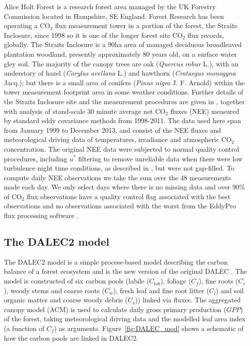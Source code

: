\documentclass[review]{elsarticle}
\begin{document}
Alice Holt Forest is a research forest area managed by the UK Forestry Commission located in Hampshire, SE England. Forest Research has been operating a $\text{CO}_{2}$ flux measurement tower in a portion of the forest, the Straits Inclosure, since 1998 so it is one of the longer forest site $\text{CO}_2$ flux records, globally. The Straits Inclosure is a $90 \text{ha}$ area of managed deciduous broadleaved plantation woodland, presently approximately $80$ years old, on a surface water gley soil. The majority of the canopy trees are oak (\textit{Quercus robur} L.), with an understory of hazel (\textit{Corylus avellana} L.) and hawthorn (\textit{Crataegus monogyna} Jacq.); but there is a small area of conifers (\textit{Pinus nigra} J. F. Arnold) within the tower measurement footprint area in some weather conditions. Further details of the Straits Inclosure site and the measurement procedures are given in \citet{wilkinson2012inter}, together with analysis of stand-scale $30$ minute average net $\text{CO}_{2}$ fluxes (NEE) measured by standard eddy covariance methods from 1998-2011. The data used here span from January 1999 to December 2013, and consist of the NEE fluxes and meteorological driving data of temperatures, irradiance and atmospheric $\text{CO}_2$ concentration. The original NEE data were subjected to normal quality control procedures, including $u^{*}$ filtering to remove unreliable data when there were low turbulence night time conditions, as described in \citet{wilkinson2012inter}, but were not gap-filled. To compute daily NEE observations we take the sum over the 48 measurements made each day. We only select days where there is no missing data and over $90\% $ of $\text{CO}_2$ flux observations have a quality control flag associated with the best observations and no observations associated with the worst from the EddyPro flux processing software \citep{eddypro}.

\subsection{The DALEC2 model}

The DALEC2 model is a simple process-based model describing the carbon balance of a forest ecosystem \citep{Bloom2015} and is the new version of the original DALEC \citep{williams2005improved}. The model is constructed of six carbon pools (labile ($C_{lab}$), foliage ($C_f$), fine roots ($C_r$), woody stems and coarse roots ($C_w$), fresh leaf and fine root litter ($C_l$) and soil organic matter and coarse woody debris ($C_s$)) linked via fluxes. The aggregated canopy model (ACM) \citep{williams1997predicting} is used to calculate daily gross primary production ($GPP$) of the forest, taking meteorological driving data and the modelled leaf area index (a function of $C_f$) as arguments. Figure~\ref{fig:DALEC_mod} shows a schematic of how the carbon pools are linked in DALEC2.   
\end{document}
